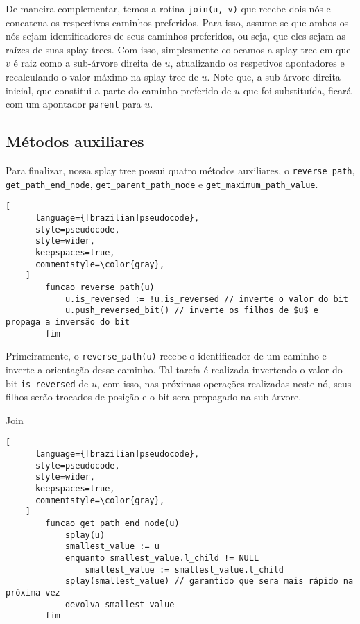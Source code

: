 De maneira complementar, temos a rotina \texttt{join(u, v)} que recebe dois nós e concatena os respectivos caminhos preferidos. Para isso, assume-se que ambos os nós sejam identificadores de seus caminhos preferidos, ou seja, que eles sejam as raízes de suas splay trees. Com isso, simplesmente colocamos a splay tree em que $v$ é raiz como a sub-árvore direita de $u$, atualizando os respetivos apontadores e recalculando o valor máximo na splay tree de $u$. Note que, a sub-árvore direita inicial, que constitui a parte do caminho preferido de $u$ que foi substituída, ficará com um apontador \texttt{parent} para $u$.

\subsection{Métodos auxiliares}
\label{subsection:lct-splay-aux}

Para finalizar, nossa splay tree possui quatro métodos auxiliares, o \texttt{reverse\_path}, \texttt{get\_path\_end\_node}, \texttt{get\_parent\_path\_node} e \texttt{get\_maximum\_path\_value}.

\begin{programruledcaption}{\label{splay:reverse-path}}
    \begin{lstlisting}[
      language={[brazilian]pseudocode},
      style=pseudocode,
      style=wider,
      keepspaces=true,
      commentstyle=\color{gray},
    ]
        funcao reverse_path(u)
            u.is_reversed := !u.is_reversed // inverte o valor do bit
            u.push_reversed_bit() // inverte os filhos de $u$ e propaga a inversão do bit
        fim
    \end{lstlisting}
\end{programruledcaption}

Primeiramente, o \texttt{reverse\_path(u)} recebe o identificador de um caminho e inverte a orientação desse caminho. Tal tarefa é realizada invertendo o valor do bit \texttt{is\_reversed} de $u$, com isso, nas próximas operações realizadas neste nó, seus filhos serão trocados de posição e o bit sera propagado na sub-árvore.

\begin{programruledcaption}{Join\label{splay:get-path-end}}
    \begin{lstlisting}[
      language={[brazilian]pseudocode},
      style=pseudocode,
      style=wider,
      keepspaces=true,
      commentstyle=\color{gray},
    ]
        funcao get_path_end_node(u)
            splay(u)
            smallest_value := u
            enquanto smallest_value.l_child != NULL
                smallest_value := smallest_value.l_child
            splay(smallest_value) // garantido que sera mais rápido na próxima vez
            devolva smallest_value
        fim
    \end{lstlisting}
\end{programruledcaption}

